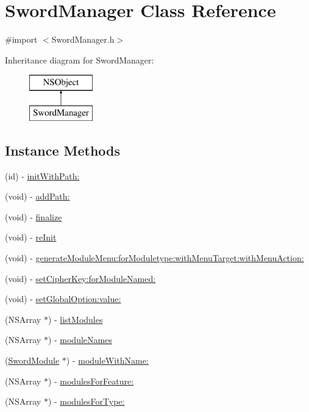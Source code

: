\hypertarget{interface_sword_manager}{\section{Sword\-Manager Class Reference}
\label{interface_sword_manager}
}


{\ttfamily \#import $<$Sword\-Manager.\-h$>$}

Inheritance diagram for Sword\-Manager\-:\begin{figure}[H]
\begin{center}
\leavevmode
\includegraphics[height=2.000000cm]{interface_sword_manager}
\end{center}
\end{figure}
\subsection*{Instance Methods}
\begin{DoxyCompactItemize}
\item 
(id) -\/ \hyperlink{interface_sword_manager_a0e145f8d86c15e4694540a8830f8d290}{init\-With\-Path\-:}
\item 
(void) -\/ \hyperlink{interface_sword_manager_a464e99688dc329b4d58f3da1d11e46e7}{add\-Path\-:}
\item 
(void) -\/ \hyperlink{interface_sword_manager_a32d626626eee0bc4ade146973f6abb1c}{finalize}
\item 
(void) -\/ \hyperlink{interface_sword_manager_a8ccd74b314363524b19dfab49c470b4c}{re\-Init}
\item 
(void) -\/ \hyperlink{interface_sword_manager_abf1332dd137b32797bb75bdd35ccde44}{generate\-Module\-Menu\-:for\-Moduletype\-:with\-Menu\-Target\-:with\-Menu\-Action\-:}
\item 
(void) -\/ \hyperlink{interface_sword_manager_a3a7510af67457fafc54485b612d45ce9}{set\-Cipher\-Key\-:for\-Module\-Named\-:}
\item 
(void) -\/ \hyperlink{interface_sword_manager_a127ee9df2d17b68af339236f178cad62}{set\-Global\-Option\-:value\-:}
\item 
(N\-S\-Array $\ast$) -\/ \hyperlink{interface_sword_manager_abda52fffb7ad3591582d6e0b70e67b9c}{list\-Modules}
\item 
(N\-S\-Array $\ast$) -\/ \hyperlink{interface_sword_manager_a65b30d3f09dd9f97cf483b30c2fbe4a5}{module\-Names}
\item 
(\hyperlink{interface_sword_module}{Sword\-Module} $\ast$) -\/ \hyperlink{interface_sword_manager_ad72d7a62345057f44c3358a7bce1582d}{module\-With\-Name\-:}
\item 
(N\-S\-Array $\ast$) -\/ \hyperlink{interface_sword_manager_ae5999d6e92b6d40bded0c636cb158da2}{modules\-For\-Feature\-:}
\item 
(N\-S\-Array $\ast$) -\/ \hyperlink{interface_sword_manager_a372b90b150c5afbc5b53069919108419}{modules\-For\-Type\-:}
\end{DoxyCompactItemize}
